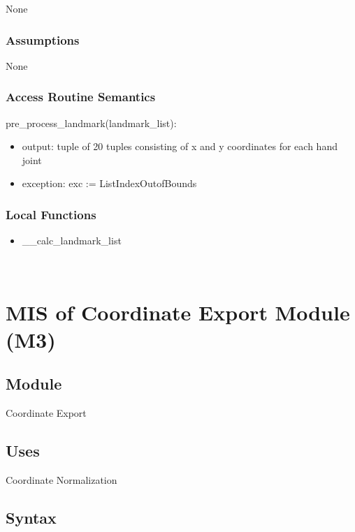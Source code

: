 \documentclass[12pt, titlepage]{article}
\begin{document}
None\\

\subsubsection{Assumptions}

None

\subsubsection{Access Routine Semantics}

\noindent pre\_process\_landmark(landmark\_list):
\begin{itemize}
\item output: tuple of 20 tuples consisting of x and y coordinates for each hand joint
\item exception: exc := ListIndexOutofBounds\\
\end{itemize}

\subsubsection{Local Functions}
\begin{itemize}
\item \_\_calc\_landmark\_list\\
\end{itemize}

~\newpage

\section{MIS of Coordinate Export Module (M3)} \label{M3}

\subsection{Module}

Coordinate Export\\

\subsection{Uses}

Coordinate Normalization\\

\subsection{Syntax}
\end{document}

